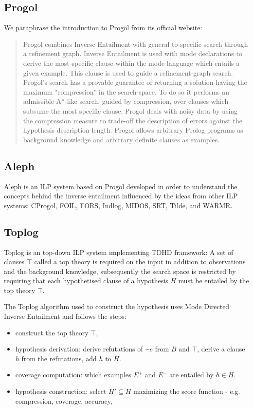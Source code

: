 \subsection{Progol}
We paraphrase the introduction to Progol from its official website\cite{muggleton1999progolWebsite}:
\begin{quote}
Progol combines Inverse Entailment with general-to-specific search through a refinement graph. Inverse Entailment is used with mode declarations to derive the most-specific clause within the mode language which entails a given example. This clause is used to guide a refinement-graph search. Progol's search has a provable guarantee of returning a solution having the maximum "compression" in the search-space. To do so it performs an admissible A*-like search, guided by compression, over clauses which subsume the most specific clause. Progol deals with noisy data by using the compression measure to trade-off the description of errors against the hypothesis description length. Progol allows arbitrary Prolog programs as background knowledge and arbitrary definite clauses as examples.
\end{quote}

\subsection{Aleph\cite{aleph2007}}
Aleph is an ILP system based on Progol developed in order to understand the concepts behind the inverse entailment\cite{muggleton1995inverse} influenced by the ideas from other ILP systems: CProgol, FOIL, FORS, Indlog, MIDOS, SRT, Tilde, and WARMR. 

\subsection{Toplog\cite{santos2008toplogWebsite}\cite{muggleton2008toplog}}
Toplog is an top-down ILP system implementing TDHD framework:
A set of clauses $\top$ called a top theory is required on the input in addition to observations and the background knowledge, subsequently the search space is restricted by requiring that each hypothetised clause of a hypothesis $H$ must be entailed by the top theory $\top$.

The Toplog algorithm used to construct the hypothesis uses Mode Directed Inverse Entailment and follows the steps:
\begin{itemize}
\item construct the top theory $\top$,
\item hypothesis derivation: derive refutations of $\neg e$ from $B$ and $\top$, derive a clause $h$ from the refutations, add $h$ to $H$.
\item coverage computation: which examples $E^+$ and $E^-$ are entailed by $h \in H$.
\item hypothesis construction: select $H' \subseteq H$ maximizing the score function - e.g. compression, coverage, accuracy,
\end{itemize}

